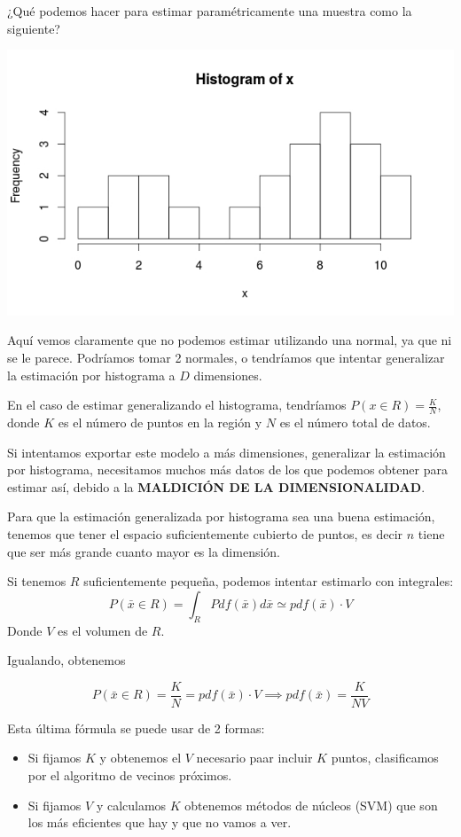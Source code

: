 \documentclass{apuntes}
\begin{document}
 ¿Qué podemos hacer para estimar paramétricamente una muestra como la siguiente?

\begin{center}
 \includegraphics[scale=0.4]{img/histogramaCenas.jpeg}
\end{center}
Aquí vemos claramente que no podemos estimar utilizando una normal, ya que ni se le parece. Podríamos tomar 2 normales, o tendríamos que intentar generalizar la estimación por histograma a $D$ dimensiones.


En el caso de estimar generalizando el histograma, tendríamos $P(x∈R) = \frac{K}{N}$, donde $K$ es el número de puntos en la región y $N$ es el número total de datos.


Si intentamos exportar este modelo a más dimensiones, generalizar la estimación por histograma, necesitamos muchos más datos de los que podemos obtener para estimar así, debido a la \textbf{MALDICIÓN DE LA DIMENSIONALIDAD}. 

Para que la estimación generalizada por histograma sea una buena estimación, tenemos que tener el espacio suficientemente cubierto de puntos, es decir $n$ tiene que ser más grande cuanto mayor es la dimensión.

Si tenemos $R$ suficientemente pequeña, podemos intentar estimarlo con integrales: \[P(\bar{x}∈R) = \int_R Pdf(\bar{x})d\bar{x} \simeq pdf(\bar{x})·V\]
Donde $V$ es el volumen de $R$.

Igualando, obtenemos 

\[
P(\bar{x}∈R) = \frac{K}{N} = pdf(\bar{x})·V \implies pdf(\bar{x}) = \frac{K}{NV}
\]

Esta última fórmula se puede usar de 2 formas:

\begin{itemize}
	\item Si fijamos $K$ y obtenemos el $V$ necesario paar incluir $K$ puntos, clasificamos por el algoritmo de vecinos próximos.
	\item Si fijamos $V$ y calculamos $K$ obtenemos métodos de núcleos (SVM) que son los más eficientes que hay y que no vamos a ver.
\end{itemize}
\end{document}
